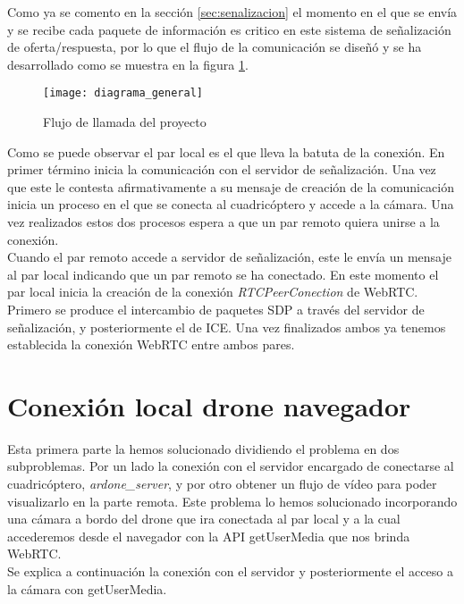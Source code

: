 Como ya se comento en la sección \ref{sec:senalizacion} el momento en el que se envía y se recibe cada paquete de información es critico en este sistema de señalización de oferta/respuesta, por lo que el flujo de la comunicación se diseñó y se ha desarrollado como se muestra en la figura \ref{fig:flujodellamada}.\\


\begin{figure}[h!]
\centering
\texttt{[image: diagrama\_general]}
\caption{Flujo de llamada del proyecto}
\label{fig:flujodellamada}
\end{figure}

Como se puede observar el par local es el que lleva la batuta de la conexión. En primer término inicia la comunicación con el servidor de señalización. Una vez que este le contesta afirmativamente a su mensaje de creación de la comunicación inicia un proceso en el que se conecta al cuadricóptero y accede a la cámara. Una vez realizados estos dos procesos espera a que un par remoto quiera unirse a la conexión.\\

Cuando el par remoto accede a servidor de señalización, este le envía un mensaje al par local indicando que un par remoto se ha conectado. En este momento el par local inicia la creación de la conexión \emph{RTCPeerConection} de WebRTC. Primero se produce el intercambio de paquetes SDP a través del servidor de señalización, y posteriormente el de ICE. Una vez finalizados ambos ya tenemos establecida la conexión WebRTC entre ambos pares.\\

\section{Conexión local drone navegador}

Esta primera parte la hemos solucionado dividiendo el problema en dos subproblemas. Por un lado la conexión con el servidor encargado de conectarse al cuadricóptero, \emph{ardone\_server}, y por otro obtener un flujo de vídeo para poder visualizarlo en la parte remota. Este problema lo hemos solucionado incorporando una cámara a bordo del drone que ira conectada al par local y a la cual accederemos desde el navegador con la API getUserMedia que nos brinda WebRTC.\\

Se explica a continuación la conexión con el servidor y posteriormente el acceso a la cámara con getUserMedia.\\


